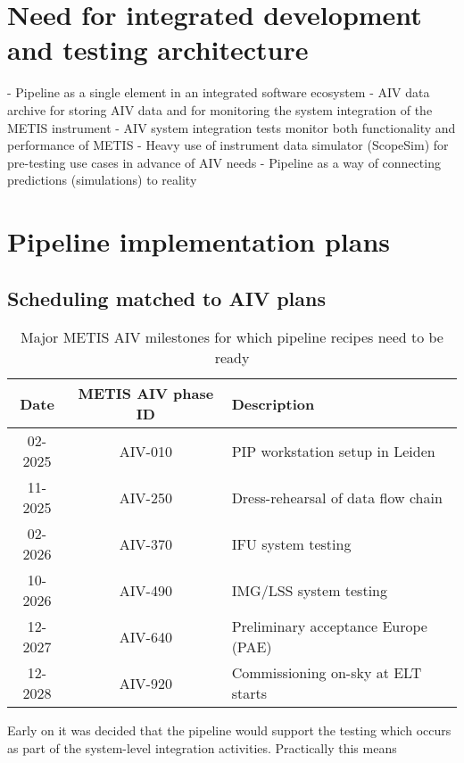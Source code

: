 \documentclass[a4paper]{spie}  %
\begin{document}
\section{Need for integrated development and testing architecture}
- Pipeline as a single element in an integrated software ecosystem
- AIV data archive for storing AIV data and for monitoring the system integration of the METIS instrument
- AIV system integration tests monitor both functionality and performance of METIS
- Heavy use of instrument data simulator (ScopeSim) for pre-testing use cases in advance of AIV needs
- Pipeline as a way of connecting predictions (simulations) to reality


\section{Pipeline implementation plans}

\subsection{Scheduling matched to AIV plans}

\begin{table}[]
    \centering
\caption{Major METIS AIV milestones for which pipeline recipes need to be ready}
\label{tab:dev_aiv_milestones}
    \begin{tabular}{c|c|l}
    \hline
    \hline
         Date &   METIS AIV phase ID & Description\\
         \hline
         02-2025 &   AIV-010&PIP workstation setup in Leiden\\
         11-2025 &   AIV-250&Dress-rehearsal of data flow chain\\
 02-2026 & AIV-370&IFU system testing\\
 10-2026 &  AIV-490&IMG/LSS system testing\\
 12-2027 & AIV-640&Preliminary acceptance Europe (PAE)\\
 12-2028 & AIV-920&Commissioning on-sky at ELT starts\\
 \hline
 \end{tabular}
      
\end{table}

Early on it was decided that the pipeline would support the testing which occurs as part of the system-level integration activities.
Practically this means 
\end{document}
